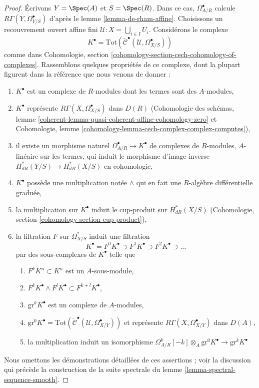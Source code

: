 \begin{proof}
Écrivons $Y = \Spec(A)$ et $S = \Spec(R)$.
Dans ce cas, $\Omega^\bullet_{A/R}$ calcule
$R\Gamma(Y, \Omega^\bullet_{Y/S})$ d'après le lemme \ref{lemma-de-rham-affine}.
Choisissons un recouvrement ouvert affine fini $\mathcal{U} : X = \bigcup_{i \in I} U_i$.
Considérons le complexe
$$
K^\bullet =
\text{Tot}(\check{\mathcal{C}}^\bullet(\mathcal{U}, \Omega_{X/S}^\bullet))
$$
comme dans
Cohomologie, section \ref{cohomology-section-cech-cohomology-of-complexes}.
Rassemblons quelques propriétés de ce complexe, dont la plupart
figurent dans la référence que nous venons de donner :
\begin{enumerate}
\item $K^\bullet$ est un complexe de $R$-modules dont les termes sont des
$A$-modules,
\item $K^\bullet$ représente $R\Gamma(X, \Omega^\bullet_{X/S})$ dans $D(R)$
(Cohomologie des schémas, lemme
\ref{coherent-lemma-quasi-coherent-affine-cohomology-zero} et
Cohomologie, lemme \ref{cohomology-lemma-cech-complex-complex-computes}),
\item il existe un morphisme naturel $\Omega^\bullet_{A/R} \to K^\bullet$
de complexes de $R$-modules, $A$-linéaire sur les termes, qui
induit le morphisme d'image inverse $H^*_{dR}(Y/S) \to H^*_{dR}(X/S)$
en cohomologie,
\item $K^\bullet$ possède une multiplication notée $\wedge$
qui en fait une $R$-algèbre différentielle graduée,
\item la multiplication sur $K^\bullet$
induit le cup-produit sur $H^*_{dR}(X/S)$
(Cohomologie, section \ref{cohomology-section-cup-product}),
\item la filtration $F$ sur $\Omega^*_{X/S}$ induit une filtration
$$
K^\bullet =
F^0K^\bullet \supset F^1K^\bullet \supset F^2K^\bullet \supset \ldots
$$
par des sous-complexes de $K^\bullet$ telle que
\begin{enumerate}
\item $F^kK^n \subset K^n$ est un $A$-sous-module,
\item $F^kK^\bullet \wedge F^lK^\bullet \subset F^{k + l}K^\bullet$,
\item $\text{gr}^kK^\bullet$ est un complexe de $A$-modules,
\item $\text{gr}^0K^\bullet =
\text{Tot}(\check{\mathcal{C}}^\bullet(\mathcal{U}, \Omega_{X/Y}^\bullet))$
et représente $R\Gamma(X, \Omega^\bullet_{X/Y})$ dans $D(A)$,
\item la multiplication induit un isomorphisme
$\Omega^k_{A/R}[-k] \otimes_A \text{gr}^0K^\bullet \to \text{gr}^kK^\bullet$
\end{enumerate}
\end{enumerate}
Nous omettons les démonstrations détaillées de ces assertions ; voir la discussion
qui précède la construction de la suite spectrale du
lemme \ref{lemma-spectral-sequence-smooth}.


\end{proof}
